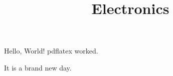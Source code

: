 \documentclass[a4paper]{report}
\title{Electronics}
\begin{document}
    \maketitle
    \tableofcontents

    Hello, World! pdflatex worked. 
    
    It is a brand new day. 
    
\end{document}
